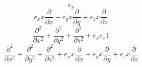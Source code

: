 \documentclass[10pt,fleqn]{report}
\newcommand{\bfrac}[2]{\displaystyle\frac{#1}{#2}}
\begin{document}
\begin{equation*} e_{x} \end{equation*}
\begin{equation*} e_{x} x \bfrac{\partial}{\partial x} + e_{y} x \bfrac{\partial}{\partial y} + e_{z} x \bfrac{\partial}{\partial z} \end{equation*}
\begin{equation*} \bfrac{\partial^{2}}{\partial x^{2}} + \bfrac{\partial^{2}}{\partial y^{2}} + \bfrac{\partial^{2}}{\partial z^{2}} + e_{x}e_{x} 1 \end{equation*}
\begin{equation*} \bfrac{\partial^{2}}{\partial x^{2}} + \bfrac{\partial^{2}}{\partial y^{2}} + \bfrac{\partial^{2}}{\partial z^{2}} + e_{x} x \bfrac{\partial}{\partial x} + e_{y} x \bfrac{\partial}{\partial y} + e_{z} x \bfrac{\partial}{\partial z} \end{equation*}
\end{document}

